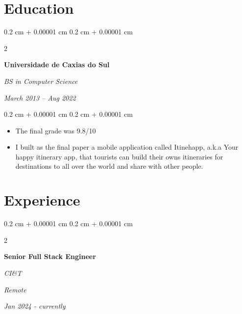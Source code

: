 \documentclass[10pt, letterpaper]{article}
\newenvironment{highlights}{
    \begin{itemize}[
        topsep=0.10 cm,
        parsep=0.10 cm,
        partopsep=0pt,
        itemsep=0pt,
        leftmargin=0.4 cm + 10pt
    ]
}{
    \end{itemize}
} %
\newenvironment{onecolentry}{
    \begin{adjustwidth}{
        0.2 cm + 0.00001 cm
    }{
        0.2 cm + 0.00001 cm
    }
}{
    \end{adjustwidth}
} %
\newenvironment{twocolentry}[2][]{
    \onecolentry
    \def\secondColumn{#2}
    \setcolumnwidth{\fill, 4.5 cm}
    \begin{paracol}{2}
}{
    \switchcolumn \raggedleft \secondColumn
    \end{paracol}
    \endonecolentry
} %
\begin{document}
    \section{Education}


        \begin{twocolentry}{
            
            
        \textit{March 2013 – Aug 2022}}
            \textbf{Universidade de Caxias do Sul}

            \textit{BS in Computer Science}
        \end{twocolentry}

        \vspace{0.10 cm}
        \begin{onecolentry}
            \begin{highlights}
                \item The final grade was 9.8/10
                \item I built as the final paper a mobile application called Itinehapp, a.k.a Your happy itinerary app, that tourists can build their owns itineraries for destinations to all over the world and share with other people.
            \end{highlights}
        \end{onecolentry}



    
    \section{Experience}

        \begin{twocolentry}{
        \textit{Remote}    
            
        \textit{Jan 2024 - currently}}
            \textbf{Senior Full Stack Engineer}
            
            \textit{CI\&T}
        \end{twocolentry}
\end{document}
